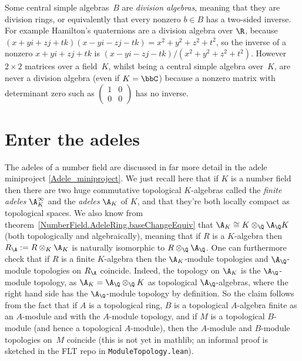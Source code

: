 Some central simple algebras~$B$ are \emph{division algebras}, meaning that they are division
rings, or equivalently that every nonzero $b\in B$ has a two-sided inverse. For example
Hamilton's quaternions are a division algebra over $\R$,
because $(x+yi+zj+tk)(x-yi-zj-tk)=x^2+y^2+z^2+t^2$, so the inverse
of a nonzero $x+yi+zj+tk$ is $(x-yi-zj-tk)/(x^2+y^2+z^2+t^2)$.
However $2\times 2$ matrices over a field~$K$, whilst being a central simple algebra
over~$K$, are never a division algebra
(even if $K=\bbC$) because a nonzero matrix with determinant zero such as
$\begin{pmatrix}1&0\\0&0\end{pmatrix}$ has no inverse.

\section{Enter the adeles}

The adeles of a number field are discussed in far more detail
in the adele miniproject \ref{Adele_miniproject}. We just recall here that if $K$ is a number field
then there are two huge commutative topological $K$-algebras called the \emph{finite adeles}
$\A_K^\infty$ and the \emph{adeles} $\A_K$ of $K$, and that they're both locally compact
as topological spaces. We also know from theorem~\ref{NumberField.AdeleRing.baseChangeEquiv}
that $\A_K\cong K\otimes_{\Q}\A_{\Q}K$ (both topologically and algebraically), meaning
that if $R$ is a $K$-algebra then $R_{\A} := R\otimes_K\A_K$ is naturally isomorphic
to $R\otimes_{\Q}\A_{\Q}$. One can
furthermore check that if $R$ is a finite $K$-algebra then the $\A_K$-module topologies and $\A_{\Q}$-module
topologies on $R_{\A}$ coincide. Indeed, the topology on $\A_K$
is the $\A_{\Q}$-module topology, as
$\A_K=\A_{\Q}\otimes_{\Q}K$ as topological $\A_{\Q}$-algebras, where the right hand side
has the $\A_{\Q}$-module topology by definition. So the claim follows from the
fact that if $A$ is a topological ring, $B$ is a topological $A$-algebra
finite as an $A$-module and with the $A$-module topology, and if
$M$ is a topological $B$-module
(and hence a topological $A$-module), then the $A$-module and $B$-module
topologies on~$M$ coincide (this is not yet in mathlib; an informal proof
is sketched in the FLT repo in {\tt ModuleTopology.lean}).

